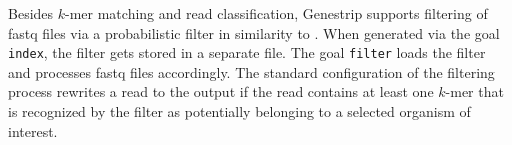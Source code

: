\documentclass[pdflatex,sn-vancouver-num]{sn-jnl}
\begin{document}
        Besides $k$-mer matching and read classification, Genestrip supports filtering of fastq files via a probabilistic filter in similarity to \citep{biobloom}. When generated via the goal \verb|index|, the filter gets stored in a separate file. The goal \verb|filter| loads the filter and processes fastq files accordingly. The standard configuration of the filtering process rewrites a read to the output if the read contains at least one $k$-mer that is recognized by the filter as potentially belonging to a selected organism of interest.

%
%    
%
\end{document}
